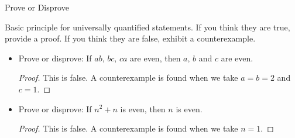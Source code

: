 \vspace*{2em}

\begin{mdframed}
\begin{center}
{\Large Prove or Disprove}
\end{center}
\end{mdframed}

\begin{discussion}
Basic principle for universally quantified statements. If you think they are true, provide a proof. If you think they are false, exhibit a counterexample.
\end{discussion}

\vspace*{1em}

\begin{example}\hfill
\begin{itemize}
\item Prove or disprove: If $ab,\,bc,\,ca$ are even, then $a,\,b$ and $c$ are even.
\begin{proof}
This is false. A counterexample is found when we take $a = b = 2$ and $c = 1$.
\end{proof}

\item Prove or disprove: If $n^2 + n$ is even, then $n$ is even.
\begin{proof}
This is false. A counterexample is found when we take $n = 1$.
\end{proof}


\end{itemize}
\end{example}

\vspace*{1em}

